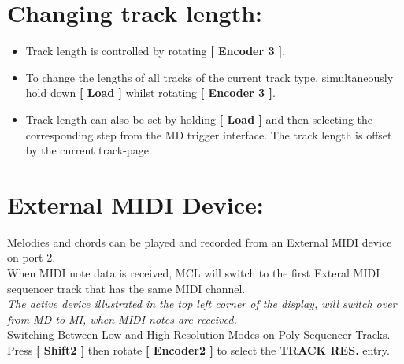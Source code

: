 \section{Changing track length:}
\begin{itemize}
\item Track length is controlled by rotating \textbf{[ Encoder 3 ]}.
\item To change the lengths of all tracks of the current track type, simultaneously hold down \textbf{[ Load ]} whilst rotating \textbf{[ Encoder 3 ]}.
\item Track length can also be set by holding \textbf{[ Load ]} and then selecting the corresponding step from the MD trigger interface. The track length is offset by the current track-page.
\end{itemize}


\section{External MIDI Device:}
Melodies and chords can be played and recorded from an External MIDI device on port 2.
\\

When MIDI note data is received, MCL will switch to the first Exteral MIDI sequencer track that has the same MIDI channel.
\\

\textit{The active device illustrated in the top left corner of the display, will switch over from MD to MI, when MIDI notes are received.}
\\

Switching Between Low and High Resolution Modes on Poly Sequencer Tracks.
Press \textbf{[ Shift2 ]} then rotate \textbf{[ Encoder2 ]} to select the \textbf{TRACK RES.} entry.
